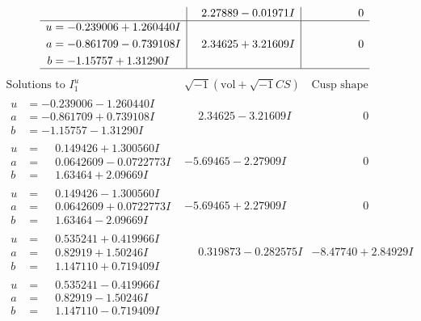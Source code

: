 \documentclass[1p]{elsarticle_modified}
\theoremstyle{definition}
\newcommand{\I}{\sqrt{-1}}
\begin{document}
$$\begin{array}{c|c|c}
 & \phantom{-}2.27889 - 0.01971 I & \phantom{-0.000000 } 0 \\ \hline\begin{aligned}
u &= -0.239006 + 1.260440 I \\
a &= -0.861709 - 0.739108 I \\
b &= -1.15757 + 1.31290 I\end{aligned}
 & \phantom{-}2.34625 + 3.21609 I & \phantom{-0.000000 } 0\\
 \hline 
 \end{array}$$\newpage$$\begin{array}{c|c|c}  
\text{Solutions to }I^u_{1}& \I (\text{vol} + \sqrt{-1}CS) & \text{Cusp shape}\\
 \hline 
\begin{aligned}
u &= -0.239006 - 1.260440 I \\
a &= -0.861709 + 0.739108 I \\
b &= -1.15757 - 1.31290 I\end{aligned}
 & \phantom{-}2.34625 - 3.21609 I & \phantom{-0.000000 } 0 \\ \hline\begin{aligned}
u &= \phantom{-}0.149426 + 1.300560 I \\
a &= \phantom{-}0.0642609 - 0.0722773 I \\
b &= \phantom{-}1.63464 + 2.09669 I\end{aligned}
 & -5.69465 - 2.27909 I & \phantom{-0.000000 } 0 \\ \hline\begin{aligned}
u &= \phantom{-}0.149426 - 1.300560 I \\
a &= \phantom{-}0.0642609 + 0.0722773 I \\
b &= \phantom{-}1.63464 - 2.09669 I\end{aligned}
 & -5.69465 + 2.27909 I & \phantom{-0.000000 } 0 \\ \hline\begin{aligned}
u &= \phantom{-}0.535241 + 0.419966 I \\
a &= \phantom{-}0.82919 + 1.50246 I \\
b &= \phantom{-}1.147110 + 0.719409 I\end{aligned}
 & \phantom{-}0.319873 - 0.282575 I & -8.47740 + 2.84929 I \\ \hline\begin{aligned}
u &= \phantom{-}0.535241 - 0.419966 I \\
a &= \phantom{-}0.82919 - 1.50246 I \\
b &= \phantom{-}1.147110 - 0.719409 I\end{aligned}

\end{array}$$
\end{document}
